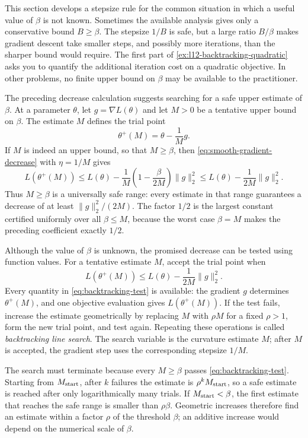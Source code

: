 \documentclass[11pt,twoside]{article}
\theoremstyle{definition}
\theoremstyle{remark}
\begin{document}
This section develops a stepsize rule for the common situation in which a
useful value of $\beta$ is not known. Sometimes the available analysis gives
only a conservative bound $B\ge\beta$. The stepsize $1/B$ is safe, but a
large ratio $B/\beta$ makes gradient descent take smaller steps, and possibly
more iterations, than the sharper bound would require. The first part of
\cref{ex:l12-backtracking-quadratic} asks you to quantify the additional
iteration cost on a quadratic objective. In other problems, no finite upper
bound on $\beta$ may be available to the practitioner.

The preceding decrease calculation suggests searching for a safe upper
estimate of $\beta$. At a parameter $\theta$, let $g=\nabla L(\theta)$ and
let $M>0$ be a tentative upper bound on $\beta$. The estimate $M$ defines the
trial point
\begin{equation}
 \theta^+(M)=\theta-\frac1M g.
\label{eq:trial-point}
\end{equation}
If $M$ is indeed an upper bound, so that $M\ge\beta$, then
\cref{eq:smooth-gradient-decrease} with $\eta=1/M$ gives
\[
 L(\theta^+(M))
 \le L(\theta)
 -\frac1M\left(1-\frac{\beta}{2M}\right)\|g\|_2^2
 \le L(\theta)-\frac1{2M}\|g\|_2^2.
\]
Thus $M\ge\beta$ is a universally safe range: every estimate in that range
guarantees a decrease of at least $\|g\|_2^2/(2M)$. The factor $1/2$ is the
largest constant certified uniformly over all $\beta\le M$, because the worst
case $\beta=M$ makes the preceding coefficient exactly $1/2$.

Although the value of $\beta$ is unknown, the promised decrease can be tested
using function values. For a tentative estimate $M$, accept the trial point
when
\begin{equation}
 L(\theta^+(M))
 \le L(\theta)-\frac1{2M}\|g\|_2^2.
\label{eq:backtracking-test}
\end{equation}
Every quantity in \cref{eq:backtracking-test} is available: the gradient $g$
determines $\theta^+(M)$, and one objective evaluation gives
$L(\theta^+(M))$. If the test fails, increase the estimate geometrically by
replacing $M$ with $\rho M$ for a fixed $\rho>1$, form the new trial point,
and test again. Repeating these operations is called \emph{backtracking line
search}. The search variable is the curvature estimate $M$; after $M$ is
accepted, the gradient step uses the corresponding stepsize $1/M$.

The search must terminate because every $M\ge\beta$ passes
\cref{eq:backtracking-test}. Starting from $M_{\rm start}$, after $k$ failures
the estimate is $\rho^kM_{\rm start}$, so a safe estimate is reached after
only logarithmically many trials. If $M_{\rm start}<\beta$, the first estimate
that reaches the safe range is smaller than $\rho\beta$. Geometric increases
therefore find an estimate within a factor $\rho$ of the threshold $\beta$;
an additive increase would depend on the numerical scale of $\beta$.
\end{document}
